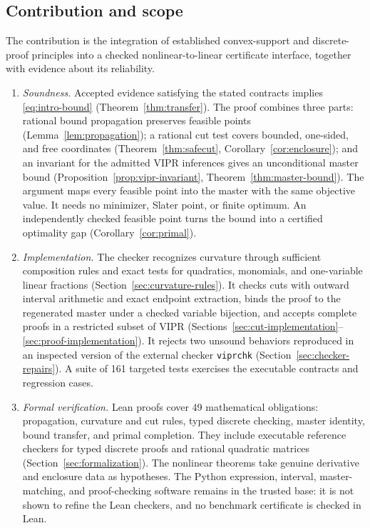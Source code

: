 \subsection{Contribution and scope}
\label{sec:contribution}
The contribution is the integration of established convex-support and discrete-proof principles into a checked nonlinear-to-linear certificate interface, together with evidence about its reliability.
\begin{enumerate}
\item \emph{Soundness.} Accepted evidence satisfying the stated contracts implies \eqref{eq:intro-bound} (Theorem~\ref{thm:transfer}). The proof combines three parts: rational bound propagation preserves feasible points (Lemma~\ref{lem:propagation}); a rational cut test covers bounded, one-sided, and free coordinates (Theorem~\ref{thm:safecut}, Corollary~\ref{cor:enclosure}); and an invariant for the admitted VIPR inferences gives an unconditional master bound (Proposition~\ref{prop:vipr-invariant}, Theorem~\ref{thm:master-bound}). The argument maps every feasible point into the master with the same objective value. It needs no minimizer, Slater point, or finite optimum. An independently checked feasible point turns the bound into a certified optimality gap (Corollary~\ref{cor:primal}).
\item \emph{Implementation.} The checker recognizes curvature through sufficient composition rules and exact tests for quadratics, monomials, and one-variable linear fractions (Section~\ref{sec:curvature-rules}). It checks cuts with outward interval arithmetic and exact endpoint extraction, binds the proof to the regenerated master under a checked variable bijection, and accepts complete proofs in a restricted subset of VIPR (Sections~\ref{sec:cut-implementation}--\ref{sec:proof-implementation}). It rejects two unsound behaviors reproduced in an inspected version of the external checker \texttt{viprchk} (Section~\ref{sec:checker-repairs}). A suite of 161 targeted tests exercises the executable contracts and regression cases.
\item \emph{Formal verification.} Lean proofs cover 49 mathematical obligations: propagation, curvature and cut rules, typed discrete checking, master identity, bound transfer, and primal completion. They include executable reference checkers for typed discrete proofs and rational quadratic matrices (Section~\ref{sec:formalization}). The nonlinear theorems take genuine derivative and enclosure data as hypotheses. The Python expression, interval, master-matching, and proof-checking software remains in the trusted base: it is not shown to refine the Lean checkers, and no benchmark certificate is checked in Lean.

\end{enumerate}
